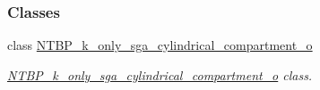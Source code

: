 \subsubsection*{Classes}
\begin{DoxyCompactItemize}
\item 
class \hyperlink{class_n_t_b_p__k__only__sga__cylindrical__compartment__o}{NTBP\_\-k\_\-only\_\-sga\_\-cylindrical\_\-compartment\_\-o}
\begin{DoxyCompactList}\small\item\em \hyperlink{class_n_t_b_p__k__only__sga__cylindrical__compartment__o}{NTBP\_\-k\_\-only\_\-sga\_\-cylindrical\_\-compartment\_\-o} class. \item\end{DoxyCompactList}\end{DoxyCompactItemize}
